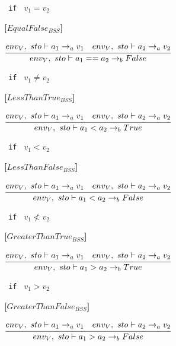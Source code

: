 {\begin{center}
	\texttt{ if } $v_1 = v_2$
\end{center}

\textbf{[$EqualFalse_{BSS}$]}\\
\begin{center}
	\begin{math}
	\cfrac
	{env_V,\ sto \vdash a_1 \rightarrow_a v_1 \quad env_V,\ sto \vdash a_2 \rightarrow_a v_2}
	{env_V,\ sto \vdash a_1 == a_2 \rightarrow_b False}
	\end{math}
	
	\texttt{ if } $v_1 \neq v_2$
\end{center}

\textbf{[$LessThanTrue_{BSS}$]}\\
\begin{center}
	\begin{math}
	\cfrac
	{env_V,\ sto \vdash a_1 \rightarrow_a v_1 \quad env_V,\ sto \vdash a_2 \rightarrow_a v_2}
	{env_V,\ sto \vdash a_1 < a_2 \rightarrow_b True}
	\end{math}
	
	\texttt{ if } $v_1 < v_2$
\end{center}

\textbf{[$LessThanFalse_{BSS}$]}\\
\begin{center}
	\begin{math}
	\cfrac
	{env_V,\ sto \vdash a_1 \rightarrow_a v_1 \quad env_V,\ sto \vdash a_2 \rightarrow_a v_2}
	{env_V,\ sto \vdash a_1 < a_2 \rightarrow_b False}
	\end{math}
	
	\texttt{ if } $v_1 \not< v_2$
\end{center}

\textbf{[$GreaterThanTrue_{BSS}$]}\\
\begin{center}
	\begin{math}
	\cfrac
	{env_V,\ sto \vdash a_1 \rightarrow_a v_1 \quad env_V,\ sto \vdash a_2 \rightarrow_a v_2}
	{env_V,\ sto \vdash a_1 > a_2 \rightarrow_b True}
	\end{math}
	
	\texttt{ if } $v_1 > v_2$
\end{center}

\textbf{[$GreaterThanFalse_{BSS}$]}\\
\begin{center}
	\begin{math}
	\cfrac
	{env_V,\ sto \vdash a_1 \rightarrow_a v_1 \quad env_V,\ sto \vdash a_2 \rightarrow_a v_2}
	{env_V,\ sto \vdash a_1 > a_2 \rightarrow_b False}
	\end{math}
	

\end{center}}
